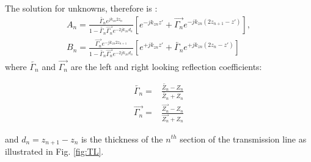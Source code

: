 \documentclass[11pt]{article}
\renewcommand{\^}{\hat}  %
\begin{document}
    The solution for unknowns, therefore is \cite[p. 1178]{michalski2005electromagnetic}:
    \begin{subequations}
      \begin{align}
        A_n = \frac{\overleftarrow{\Gamma_n} e^{j k_{zn} 2z_n }}
        {1-\overleftarrow{\Gamma_n} \overrightarrow{\Gamma_n} e^{-2j k_{zn} d_{n} }}
        \left[ e^{-j k_{zn} z'} + \overrightarrow{\Gamma_n} e^{-j k_{zn} (2z_{n+1} -z')} \right],\\
        B_n = \frac{\overrightarrow{\Gamma_n} e^{-j k_{zn} 2z_{n+1} }}
        {1-\overleftarrow{\Gamma_n} \overrightarrow{\Gamma_n} e^{-2j k_{zn} d_{n} }}
        \left[ e^{+j k_{zn} z'} + \overleftarrow{\Gamma_n} e^{+j k_{zn} (2z_n -z')} \right]
        \label{eq:AnB}
      \end{align}
    \end{subequations}
    where $\overleftarrow{\Gamma_n}$ and $\overrightarrow{\Gamma_n}$ are the left and right looking reflection coefficients:

    \begin{subequations}
      \begin{align}
        \overleftarrow{\Gamma_n} ={}& \frac{\overleftarrow{Z_n} - Z_n}{\overleftarrow{Z_n} + Z_n}
        \label{eq:R_left}\\
        \overrightarrow{\Gamma_n} ={}& \frac{\overrightarrow{Z_n} - Z_n}{\overrightarrow{Z_n} + Z_n}
        \label{eq:R_right}
      \end{align}
      \label{eq:R}
    \end{subequations}

    and $d_n = z_{n+1} - z_n$ is the thickness of the $n^{th}$ section of the transmission line as illustrated in Fig. \ref{fig:TL}.



    \clearpage %
    
    

  
\end{document}
